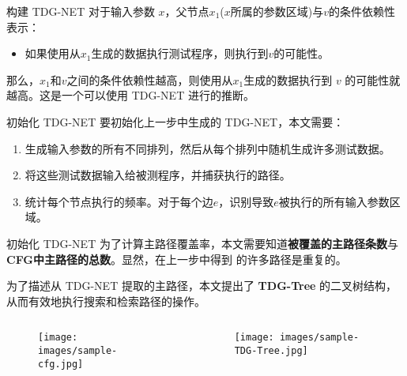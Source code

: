 \documentclass{beamer}
\begin{document}
    \begin{frame}{构建 TDG-NET}
        对于输入参数 $x$，父节点$x_1$($x$所属的参数区域)与$v$的条件依赖性表示：

        \begin{itemize}
            \item 如果使用从$x_1$生成的数据执行测试程序，则执行到$v$的可能性。
        \end{itemize}

        \vspace{2em}
        那么，$x_1$和$v$之间的条件依赖性越高，则使用从$x_1$生成的数据执行到 $v$ 的可能性就越高。这是一个可以使用 TDG-NET 进行的推断。
    \end{frame}

    \begin{frame}{初始化 TDG-NET}
        要初始化上一步中生成的 TDG-NET，本文需要：
        
        \begin{enumerate}
            \item 生成输入参数的所有不同排列，然后从每个排列中随机生成许多测试数据。
            \item 将这些测试数据输入给被测程序，并捕获执行的路径。
            \item 统计每个节点执行的频率。对于每个边$e$，识别导致$e$被执行的所有输入参数区域。
        \end{enumerate}
    \end{frame}

    \begin{frame}{初始化 TDG-NET}
        为了计算主路径覆盖率，本文需要知道\textbf{被覆盖的主路径条数}与\textbf{CFG中主路径的总数}。显然，在上一步中得到
        的许多路径是重复的。

        \vspace{1em}

        为了描述从 TDG-NET 提取的主路径，本文提出了 \textbf{TDG-Tree} 的二叉树结构，从而有效地执行搜索和检索路径的操作。

        \begin{columns}[T]
            \begin{column}{.35\textwidth}
                \begin{figure}[!ht]
                    \centering
                    \texttt{[image: images/sample-cfg.jpg]}
                \end{figure}
            \end{column}
            \begin{column}{.5\textwidth}
                \begin{figure}[!ht]
                    \centering
                    \texttt{[image: images/sample-TDG-Tree.jpg]}
                \end{figure}
            \end{column}
        \end{columns} 
    \end{frame}
\end{document}
